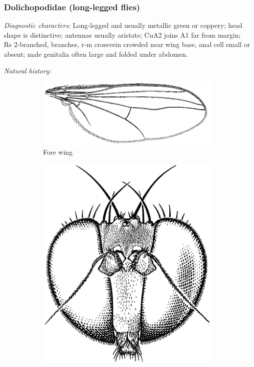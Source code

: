 \documentclass[letterpaper, 11pt]{article}
\begin{document}
\subsubsection{Dolichopodidae (long-legged flies)}
\noindent{}\textit{Diagnostic characters:} Long-legged and usually metallic green or coppery; head shape is distinctive; antennae usually aristate; CuA2 joins A1 far from margin; Rs 2-branched, branches, r-m crossvein crowded near wing base, anal cell small or absent; male genitalia often large and folded under abdomen.

\noindent{}\textit{Natural history:} \\

\begin{figure}[ht!]
    \centering
    \begin{subfigure}[ht!]{0.5\textwidth}
        \includegraphics[width=\textwidth]{DolichopodidWing}
        \caption{Fore wing \citep[][Fig. 48.30]{mcalpine1981manual}}
        \label{fig:dolicho1}
    \end{subfigure}
    \qquad
    \begin{subfigure}[ht!]{0.22\textwidth}
        \includegraphics[width=\textwidth]{DolichopodidHead}

\end{subfigure}
\end{figure}
\end{document}
